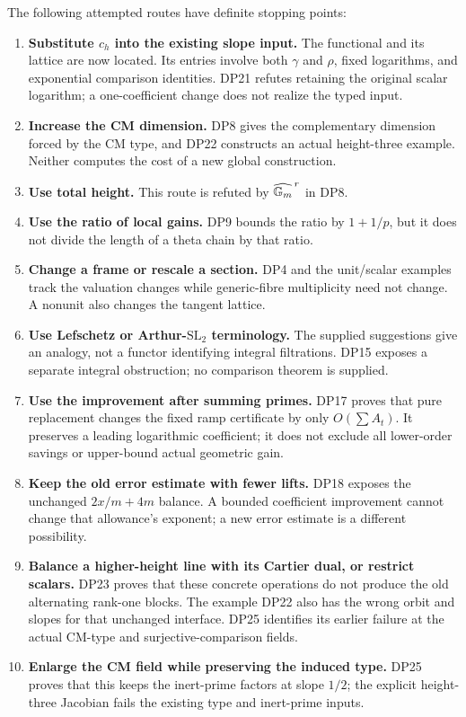 \documentclass[11pt,a4paper]{article}
\theoremstyle{definition}\newtheorem{remark}[theorem]{Remark}
\begin{document}
The following attempted routes have definite stopping points:
\begin{enumerate}[leftmargin=*,label=\arabic*.]
\item \textbf{Substitute $c_h$ into the existing slope input.} The functional and its lattice are now located. Its entries involve both $\gamma$ and $\rho$, fixed logarithms, and exponential comparison identities. DP21 refutes retaining the original scalar logarithm; a one-coefficient change does not realize the typed input.
\item \textbf{Increase the CM dimension.} DP8 gives the complementary dimension forced by the CM type, and DP22 constructs an actual height-three example. Neither computes the cost of a new global construction.
\item \textbf{Use total height.} This route is refuted by $\widehat{\mathbb G_m}^{\,r}$ in DP8.
\item \textbf{Use the ratio of local gains.} DP9 bounds the ratio by $1+1/p$, but it does not divide the length of a theta chain by that ratio.
\item \textbf{Change a frame or rescale a section.} DP4 and the unit/scalar examples track the valuation changes while generic-fibre multiplicity need not change. A nonunit also changes the tangent lattice.
\item \textbf{Use Lefschetz or Arthur-$\mathrm{SL}_2$ terminology.} The supplied suggestions give an analogy, not a functor identifying integral filtrations. DP15 exposes a separate integral obstruction; no comparison theorem is supplied.
\item \textbf{Use the improvement after summing primes.} DP17 proves that pure replacement changes the fixed ramp certificate by only $O(\sum A_t)$. It preserves a leading logarithmic coefficient; it does not exclude all lower-order savings or upper-bound actual geometric gain.
\item \textbf{Keep the old error estimate with fewer lifts.} DP18 exposes the unchanged $2x/m+4m$ balance. A bounded coefficient improvement cannot change that allowance's exponent; a new error estimate is a different possibility.
\item \textbf{Balance a higher-height line with its Cartier dual, or restrict scalars.} DP23 proves that these concrete operations do not produce the old alternating rank-one blocks. The example DP22 also has the wrong orbit and slopes for that unchanged interface. DP25 identifies its earlier failure at the actual CM-type and surjective-comparison fields.
\item \textbf{Enlarge the CM field while preserving the induced type.} DP25 proves that this keeps the inert-prime factors at slope $1/2$; the explicit height-three Jacobian fails the existing type and inert-prime inputs.

\end{enumerate}
\end{document}
